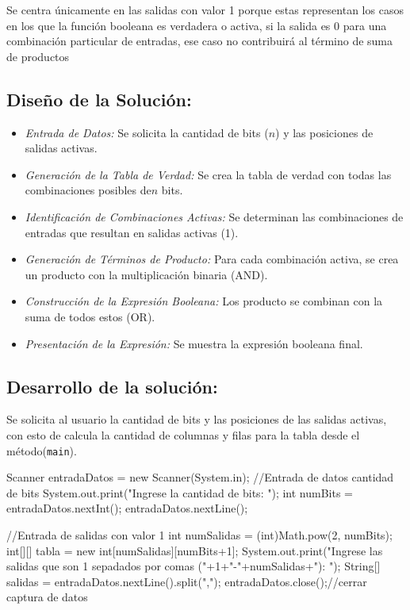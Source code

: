 Se centra únicamente en las salidas con valor 1 porque estas representan los casos en los que la función booleana es verdadera o activa, si la salida es 0 para una combinación particular de entradas, ese caso no contribuirá al término de suma de productos


\subsection{\textbf{Diseño de la Solución:}}

\begin{itemize}
    \item[{\ieeeguilsinglright}] {\it Entrada de Datos:}
        Se solicita la cantidad de bits (\(n\)) y las posiciones de salidas activas.
        
    \item[{\ieeeguilsinglright}] {\it Generación de la Tabla de Verdad:}
        Se crea la tabla de verdad con todas las combinaciones posibles de\(n\) bits.

    \item[{\ieeeguilsinglright}] {\it Identificación de Combinaciones Activas:}
        Se determinan las combinaciones de entradas que resultan en salidas activas (1).

    \item[{\ieeeguilsinglright}] {\it Generación de Términos de Producto:}
        Para cada combinación activa, se crea un producto con la multiplicación binaria (AND).

    \item[{\ieeeguilsinglright}] {\it Construcción de la Expresión Booleana:}
        Los producto se combinan con la suma de todos estos (OR).

    \item[{\ieeeguilsinglright}] {\it Presentación de la Expresión:}
         Se muestra la expresión booleana final.        
\end{itemize}
\newpage

\subsection{\textbf{Desarrollo de la solución:}}

Se solicita al usuario la cantidad de bits y las posiciones de las salidas activas, con esto de calcula la cantidad de columnas y filas para la tabla desde el método(\texttt{main}).
\begin{javaCode}
Scanner entradaDatos = new Scanner(System.in);
    //Entrada de datos cantidad de bits 
    System.out.print("Ingrese la cantidad de bits: ");
    int numBits = entradaDatos.nextInt();
    entradaDatos.nextLine();
    
    //Entrada de salidas con valor 1
    int numSalidas = (int)Math.pow(2, numBits);
    int[][] tabla = new int[numSalidas][numBits+1];
    System.out.print("Ingrese las salidas que son 1 sepadados por comas ("+1+"-"+numSalidas+"): ");
    String[] salidas = entradaDatos.nextLine().split(",");
    entradaDatos.close();//cerrar captura de datos
\end{javaCode}

